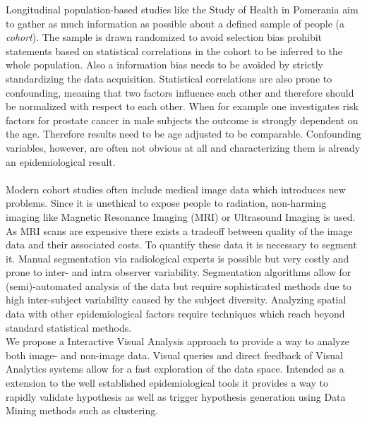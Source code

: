 \documentclass[journal]{style/vgtc}           %
\begin{document}
Longitudinal population-based studies like the Study of Health in Pomerania \cite{Volzke2011} aim to gather as much information as possible about a defined sample of people (a \emph{cohort}).
%
The sample is drawn randomized to avoid selection bias prohibit statements based on statistical correlations in the cohort to be inferred to the whole population.
%
Also a information bias needs to be avoided by strictly standardizing the data acquisition.
%
Statistical correlations are also prone to confounding, meaning that two factors influence each other and therefore should be normalized with respect to each other.
%
When for example one investigates risk factors for prostate cancer in male subjects the outcome is strongly dependent on the age.
%
Therefore results need to be age adjusted to be comparable.
%
Confounding variables, however, are often not obvious at all and characterizing them is already an epidemiological result.
\\\\
Modern cohort studies often include medical image data which introduces new problems.
%
Since it is unethical to expose people to radiation, non-harming imaging like Magnetic Resonance Imaging (MRI) or Ultrasound Imaging is used.
%
As MRI scans are expensive there exists a tradeoff between quality of the image data and their associated costs.
%
To quantify these data it is necessary to segment it.
%
Manual segmentation via radiological experts is possible but very costly and prone to inter- and intra observer variability.
%
Segmentation algorithms allow for (semi)-automated analysis of the data but require sophisticated methods due to high inter-subject variability caused by the subject diversity.
%
Analyzing spatial data with other epidemiological factors require techniques which reach beyond standard statistical methods.
\\
We propose a Interactive Visual Analysis approach to provide a way to analyze both image- and non-image data.
%
Visual queries and direct feedback of Visual Analytics systems allow for a fast exploration of the data space.
%
Intended as a extension to the well established epidemiological tools it provides a way to rapidly validate hypothesis as well as trigger hypothesis generation using Data Mining methods such as clustering.
%


\end{document}
